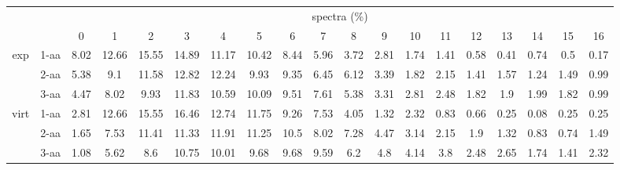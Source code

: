 \documentclass{article}[12pt]
\begin{document}
\begin{landscape}
\begin{table}[h]\tiny
\vspace{3mm}
{\centering
\begin{center}
\begin{tabular}{|c|l|c|c|c|c|c|c|c|c|c|c|c|c|c|c|c|c|c|}
  \hline
  \multicolumn{2}{|c|}{ } & \multicolumn{ 17 }{|c|}{ spectra (\%)} \\
  \cline{3- 19}
  \multicolumn{2}{|c|}{ }  & 0 & 1 & 2 & 3 & 4 & 5 & 6 & 7 & 8 & 9 & 10 & 11 & 12 & 13 & 14 & 15 & 16\\
  \hline
  \multirow{3}{*}{exp}
&  1-aa  & 8.02 & 12.66 & 15.55 & 14.89 & 11.17 & 10.42 & 8.44 & 5.96 & 3.72 & 2.81 & 1.74 & 1.41 & 0.58 & 0.41 & 0.74 & 0.5 & 0.17\\
&  2-aa  & 5.38 & 9.1 & 11.58 & 12.82 & 12.24 & 9.93 & 9.35 & 6.45 & 6.12 & 3.39 & 1.82 & 2.15 & 1.41 & 1.57 & 1.24 & 1.49 & 0.99\\
&  3-aa  & 4.47 & 8.02 & 9.93 & 11.83 & 10.59 & 10.09 & 9.51 & 7.61 & 5.38 & 3.31 & 2.81 & 2.48 & 1.82 & 1.9 & 1.99 & 1.82 & 0.99\\
 \hline
  \multirow{3}{*}{virt} 
&  1-aa  & 2.81 & 12.66 & 15.55 & 16.46 & 12.74 & 11.75 & 9.26 & 7.53 & 4.05 & 1.32 & 2.32 & 0.83 & 0.66 & 0.25 & 0.08 & 0.25 & 0.25\\
&  2-aa  & 1.65 & 7.53 & 11.41 & 11.33 & 11.91 & 11.25 & 10.5 & 8.02 & 7.28 & 4.47 & 3.14 & 2.15 & 1.9 & 1.32 & 0.83 & 0.74 & 1.49\\
&  3-aa  & 1.08 & 5.62 & 8.6 & 10.75 & 10.01 & 9.68 & 9.68 & 9.59 & 6.2 & 4.8 & 4.14 & 3.8 & 2.48 & 2.65 & 1.74 & 1.41 & 2.32\\
 \hline
\end{tabular}
\end{center}
\par}
\centering
\vspace{3mm}
\end{table}


\end{landscape}
\end{document}
